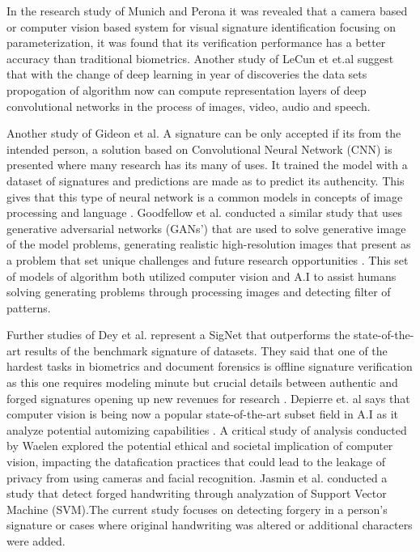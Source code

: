 \documentclass[12pt]{article}
\begin{document}
In the research study of Munich and Perona \cite{ref8} it was revealed that a camera based or computer vision based system for visual signature identification focusing on parameterization, it was found that its verification performance has a better accuracy than traditional biometrics. Another study of LeCun et et.al \cite{ref7} suggest that with the change of deep learning in year of discoveries the data sets propogation of algorithm now can compute representation layers of deep convolutional networks in the process of images, video, audio and speech.

Another study of Gideon et al. A signature can be only accepted if its from the intended person, a solution based on Convolutional Neural Network (CNN) is presented where many research has its many of uses. It trained the model with a dataset of signatures and predictions are made as to predict its authencity. This gives that this type of neural network is a common models in concepts of image processing and language \cite{ref3}. Goodfellow et al. conducted a similar study that uses generative adversarial networks (GANs’) that are used to solve generative image of the model problems, generating realistic high-resolution images that present as a problem that set unique challenges and future research opportunities \cite{ref4}. This set of models of algorithm both utilized computer vision and A.I to assist humans solving generating problems through processing images and detecting filter of patterns.

Further studies of Dey et al. represent a SigNet that outperforms the state-of-the-art results of the benchmark signature of datasets. They said that one of the hardest tasks in biometrics and document forensics is offline signature verification as this one requires modeling minute but crucial details between authentic and forged signatures opening up new revenues for research \cite{ref2}.  Depierre et. al says that computer vision is being now a popular state-of-the-art subset field in A.I as it analyze potential automizing capabilities \cite{ref1}. A critical study of analysis conducted by Waelen \cite{ref13} explored the potential ethical and societal implication of computer vision, impacting the datafication practices that could lead to the leakage of privacy from using cameras and facial recognition. Jasmin et al.\cite{ref6} conducted a study that detect forged handwriting through analyzation of Support Vector Machine (SVM).The current study focuses on detecting forgery in a person’s signature or cases where original handwriting was altered or additional characters were added.
\end{document}
